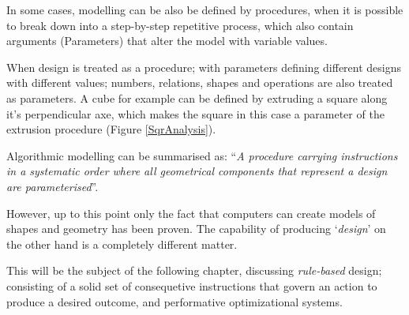 In some cases, modelling can be also be defined by procedures, when it is possible to break down into a step-by-step repetitive process, which also contain arguments (Parameters) that alter the model with variable values.

When design is treated as a procedure; with parameters defining different designs with different values; numbers, relations, shapes and operations are also treated as parameters. A cube for example can be defined by extruding a square along it's perpendicular axe, which makes the square in this case a parameter of the extrusion procedure (Figure \ref{SqrAnalysis}).

Algorithmic modelling can be summarised as: ``\emph{A procedure carrying instructions in a systematic order where all geometrical components that represent a design are parameterised}''\cite{hernandez06}. 

However, up to this point only the fact that computers can create models of shapes and geometry has been proven. The capability of producing `\emph{design}' on the other hand is a completely different matter.

This will be the subject of the following chapter, discussing \emph{rule-based} design; consisting of a solid set of consequetive instructions that govern an action to produce a desired outcome, and performative optimizational systems.
